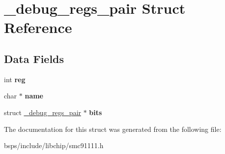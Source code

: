 \hypertarget{struct__debug__regs__pair}{}\section{\+\_\+debug\+\_\+regs\+\_\+pair Struct Reference}
\label{struct__debug__regs__pair}
\subsection*{Data Fields}
\begin{DoxyCompactItemize}
\item 
\mbox{\label{struct__debug__regs__pair_a860e4894dd3cc2a8cbe83e5f82d0b161}} 
int {\bfseries reg}
\item 
\mbox{\label{struct__debug__regs__pair_a3a48029a8ea86f2b584a8c8440520047}} 
char $\ast$ {\bfseries name}
\item 
\mbox{\label{struct__debug__regs__pair_a427959a2349954baecc5141c9f6a330a}} 
struct \mbox{\hyperlink{struct__debug__regs__pair}{\+\_\+debug\+\_\+regs\+\_\+pair}} $\ast$ {\bfseries bits}
\end{DoxyCompactItemize}


The documentation for this struct was generated from the following file\+:\begin{DoxyCompactItemize}
\item 
bsps/include/libchip/smc91111.\+h\end{DoxyCompactItemize}
